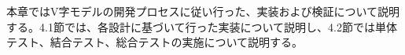本章ではV字モデルの開発プロセスに従い行った、実装および検証について説明する。4.1節では、各設計に基づいて行った実装について説明し、4.2節では単体テスト、結合テスト、総合テストの実施について説明する。